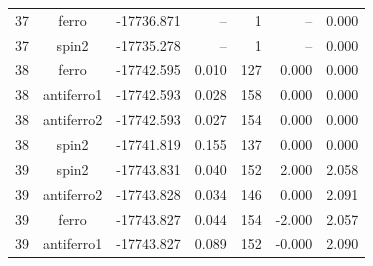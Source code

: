 \begin{longtable}{@{}ccrrrrr@{}}
37 & ferro & -17736.871 & -- & 1 & -- & 0.000 \\
37 & spin2 & -17735.278 & -- & 1 & -- & 0.000 \\
\rowcolor{gray!20} 38 & ferro & -17742.595 & 0.010 & 127 & 0.000 & 0.000 \\
38 & antiferro1 & -17742.593 & 0.028 & 158 & 0.000 & 0.000 \\
38 & antiferro2 & -17742.593 & 0.027 & 154 & 0.000 & 0.000 \\
38 & spin2 & -17741.819 & 0.155 & 137 & 0.000 & 0.000 \\
\rowcolor{gray!20} 39 & spin2 & -17743.831 & 0.040 & 152 & 2.000 & 2.058 \\
39 & antiferro2 & -17743.828 & 0.034 & 146 & 0.000 & 2.091 \\
39 & ferro & -17743.827 & 0.044 & 154 & -2.000 & 2.057 \\
39 & antiferro1 & -17743.827 & 0.089 & 152 & -0.000 & 2.090 \\
\end{longtable}